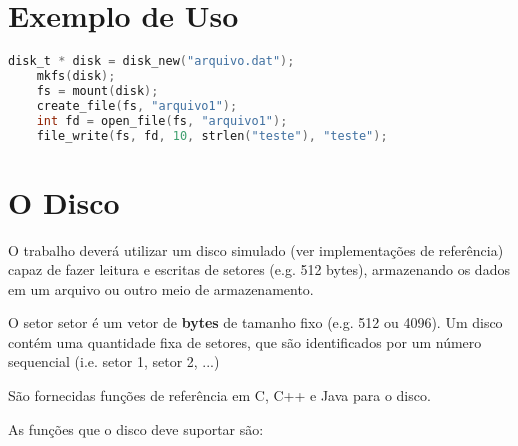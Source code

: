 \documentclass[a4paper, oneside,12pt]{article}
\begin{document}
\section{Exemplo de Uso}

\begin{lstlisting}[language=C]
    disk_t * disk = disk_new("arquivo.dat");
    mkfs(disk);
    fs = mount(disk);
    create_file(fs, "arquivo1");
    int fd = open_file(fs, "arquivo1");
    file_write(fs, fd, 10, strlen("teste"), "teste");
\end{lstlisting}

\section{O Disco}
\label{sub:Disco}

O trabalho deverá utilizar um disco simulado (ver implementações de referência) capaz de fazer leitura e escritas de setores (e.g. 512 bytes), armazenando os dados em um arquivo ou outro meio de armazenamento.

O setor setor é um vetor de \textbf{bytes} de tamanho fixo (e.g. 512 ou 4096). Um disco contém uma quantidade fixa de setores, que são identificados por um número sequencial (i.e. setor 1, setor 2, ...)

São fornecidas funções de referência em C, C++ e Java para o disco.

As funções que o disco deve suportar são:
\end{document}
